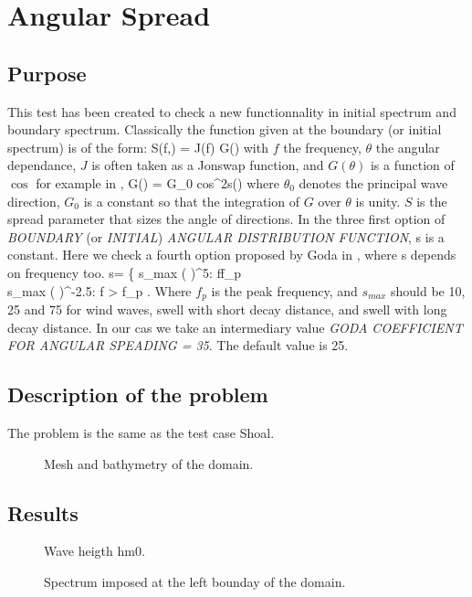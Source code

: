 \chapter{Angular Spread}
\section{Purpose}
This test has been created to check a new functionnality in initial spectrum
and boundary spectrum.
Classically the function given at the boundary (or initial spectrum) is of the
form:
\bequ
S(f,\theta) = J(f) G(\theta)
\eequ
with $f$ the frequency, $\theta$ the angular dependance, $J$ is often taken as
a Jonswap function,
and $G(\theta)$ is a function of $\cos$ for example in \cite{Mitsuyasu1975},
\bequ
G(\theta) = G_0 cos^{2s}\left(\right)
\eequ
where $\theta_0$ denotes the principal wave direction, $G_0$ is a constant so
that the integration of $G$ over $\theta$ is unity. $S$ is the spread parameter
that sizes the angle of directions. In the three first option of {\it BOUNDARY}
(or {\it INITIAL}) {\it ANGULAR DISTRIBUTION FUNCTION}, s is a constant. Here
we check a fourth option proposed by Goda in \cite{Goda1975}, where s depends
on frequency too.
\bequ
s= \left\{  s_{max} \left( \right)^5: f\le f_p \\
 s_{max} \left( \right)^{-2.5}: f > f_p \earr\right.
 \eequ
 Where $f_p$ is the peak frequency, and $s_{max}$ should be 10, 25 and 75 for
 wind waves, swell with short decay distance, and swell with long decay
 distance. In our cas we take an intermediary value {\it GODA COEFFICIENT FOR
   ANGULAR SPEADING = 35}. The default value is 25. 

\section{Description of the problem}
The problem is the same as the test case Shoal. 
\begin{figure} [!h]
\centering
{}
 \caption{Mesh and bathymetry of the domain.}
\label{meshangular_spread}
\end{figure}

\section{Results}

\begin{figure} [!h]
\centering
{}
 \caption{Wave heigth hm0.}
\label{figresAngularSpred}
\end{figure}

\begin{figure} [!h]
\centering
{}
 \caption{Spectrum imposed at the left bounday of the domain.}
\label{figresAngularSpectrum}
\end{figure}

